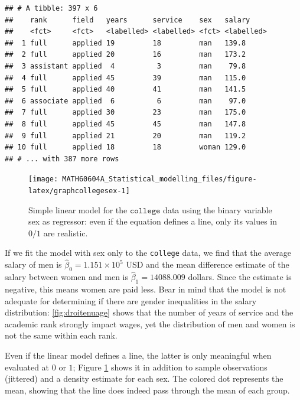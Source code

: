 \documentclass[
  11pt,
  letterpaper,
]{book}
\theoremstyle{definition}
\theoremstyle{definition}
\theoremstyle{definition}
\theoremstyle{remark}
\begin{document}
\begin{verbatim}
## # A tibble: 397 x 6
##    rank      field   years      service    sex   salary    
##    <fct>     <fct>   <labelled> <labelled> <fct> <labelled>
##  1 full      applied 19         18         man   139.8     
##  2 full      applied 20         16         man   173.2     
##  3 assistant applied  4          3         man    79.8     
##  4 full      applied 45         39         man   115.0     
##  5 full      applied 40         41         man   141.5     
##  6 associate applied  6          6         man    97.0     
##  7 full      applied 30         23         man   175.0     
##  8 full      applied 45         45         man   147.8     
##  9 full      applied 21         20         man   119.2     
## 10 full      applied 18         18         woman 129.0     
## # ... with 387 more rows
\end{verbatim}

\begin{figure}

{\centering \texttt{[image: MATH60604A\_Statistical\_modelling\_files/figure-latex/graphcollegesex-1]} 

}

\caption{Simple linear model for the $\texttt{college}$ data using the binary variable sex as regressor: even if the equation defines a line, only its values in $0/1$ are realistic.}\label{fig:graphcollegesex}
\end{figure}

If we fit the model with sex only to the \texttt{college} data, we find that the average salary of men is \(\widehat{\beta}_0=\ensuremath{1.151\times 10^{5}}\) USD and the mean difference estimate of the salary between women and men is \(\widehat{\beta}_1=14088.009\) dollars. Since the estimate is negative, this means women are paid less. Bear in mind that the model is not adequate for determining if there are gender inequalities in the salary distribution: \ref{fig:droitenuage} shows that the number of years of service and the academic rank strongly impact wages, yet the distribution of men and women is not the same within each rank.

Even if the linear model defines a line, the latter is only meaningful when evaluated at \(0\) or \(1\); Figure \ref{fig:graphcollegesex} shows it in addition to sample observations (jittered) and a density estimate for each sex. The colored dot represents the mean, showing that the line does indeed pass through the mean of each group.
\end{document}
